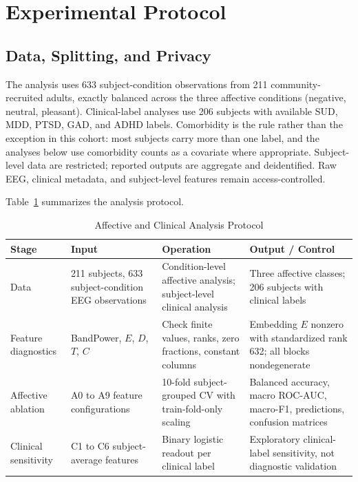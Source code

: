 \documentclass[journal]{IEEEtran}
\begin{document}
\section{Experimental Protocol}
\subsection{Data, Splitting, and Privacy}
The analysis uses 633 subject-condition observations from 211 community-recruited adults, exactly balanced across the three affective conditions (negative, neutral, pleasant). Clinical-label analyses use 206 subjects with available SUD, MDD, PTSD, GAD, and ADHD labels. Comorbidity is the rule rather than the exception in this cohort: most subjects carry more than one label, and the analyses below use comorbidity counts as a covariate where appropriate. Subject-level data are restricted; reported outputs are aggregate and deidentified. Raw EEG, clinical metadata, and subject-level features remain access-controlled.

Table~\ref{tab:protocol} summarizes the analysis protocol.

\begin{table}[!t]
\caption{Affective and Clinical Analysis Protocol}
\label{tab:protocol}
\centering
\footnotesize
\begin{tabular}{p{}p{}p{}p{}}
\toprule
Stage & Input & Operation & Output / Control \\
\midrule
Data & 211 subjects, 633 subject-condition EEG observations & Condition-level affective analysis; subject-level clinical analysis & Three affective classes; 206 subjects with clinical labels \\
Feature diagnostics & BandPower, $E$, $D$, $T$, $C$ & Check finite values, ranks, zero fractions, constant columns & Embedding $E$ nonzero with standardized rank 632; all blocks nondegenerate \\
Affective ablation & A0 to A9 feature configurations & 10-fold subject-grouped CV with train-fold-only scaling & Balanced accuracy, macro ROC-AUC, macro-F1, predictions, confusion matrices \\
Clinical sensitivity & C1 to C6 subject-average features & Binary logistic readout per clinical label & Exploratory clinical-label sensitivity, not diagnostic validation \\
\bottomrule
\end{tabular}
\end{table}
\end{document}
